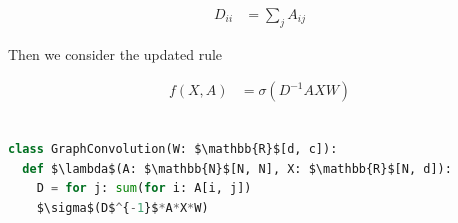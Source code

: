 \documentclass[book.tex]{subfiles}
\begin{document}
\begin{align}
    D_{ii} &= \sum_j A_{ij}
\end{align}


Then we consider the updated rule

\begin{align}
    f(X, A) &= \sigma(D^{-1}AXW)
\end{align}





\begin{lstlisting}[language=python]

class GraphConvolution(W: $\mathbb{R}$[d, c]):
  def $\lambda$(A: $\mathbb{N}$[N, N], X: $\mathbb{R}$[N, d]):
    D = for j: sum(for i: A[i, j])
    $\sigma$(D$^{-1}$*A*X*W)
    
\end{lstlisting}

\end{document}
